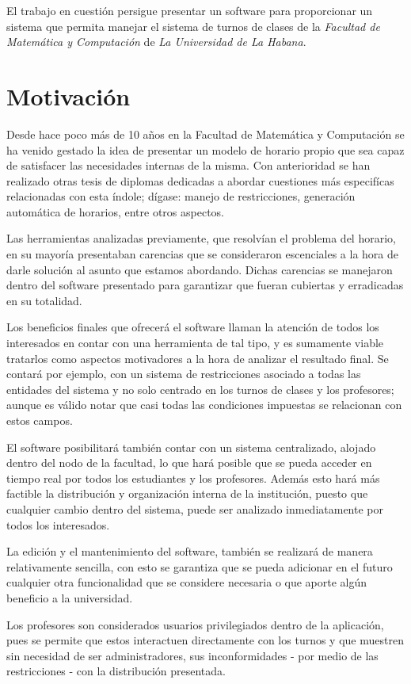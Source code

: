 El trabajo en cuestión persigue presentar un software para proporcionar un sistema que permita manejar el sistema de turnos de clases de la \textit{Facultad de Matemática y Computación} de \textit{La Universidad de La Habana}.
	
\section{Motivación}
Desde hace poco más de 10 años en la Facultad de Matemática y Computación se ha venido gestado la idea de presentar un modelo de horario propio que sea capaz de satisfacer las necesidades internas de la misma. Con anterioridad se han realizado otras tesis de diplomas dedicadas a abordar cuestiones más especifícas relacionadas con esta índole; dígase: manejo de restricciones, generación automática de horarios, entre otros aspectos. 
	
Las herramientas analizadas previamente, que resolvían el problema del horario, en su mayoría presentaban carencias que se consideraron escenciales a la hora de darle solución al asunto que estamos abordando. Dichas carencias se manejaron dentro del software presentado para garantizar que fueran cubiertas y erradicadas en su totalidad.
	
Los beneficios finales que ofrecerá el software llaman la atención de todos los interesados en contar con una herramienta de tal tipo, y es sumamente viable tratarlos como aspectos motivadores a la hora de analizar el resultado final. Se contará por ejemplo, con un sistema de restricciones asociado a todas las entidades del sistema y no solo centrado en los turnos de clases y los profesores; aunque es válido notar que casi todas las condiciones impuestas se relacionan con estos campos. 
	
El software posibilitará también contar con un sistema centralizado, alojado dentro del nodo de la facultad, lo que hará posible que se pueda acceder en tiempo real por todos los estudiantes y los profesores. Además esto hará más factible la distribución y  organización interna de la institución, puesto que cualquier cambio dentro del sistema, puede ser analizado inmediatamente por todos los interesados.
	
La edición y el mantenimiento del software, también se realizará de manera relativamente sencilla, con esto se garantiza que se pueda adicionar en el futuro cualquier otra funcionalidad que se considere necesaria o que aporte algún beneficio a la universidad. 
	
Los profesores son considerados usuarios privilegiados dentro de la aplicación, pues se permite que estos interactuen directamente con los turnos y que muestren sin necesidad de ser administradores, sus inconformidades - por medio de las restricciones -  con la distribución presentada.
	
